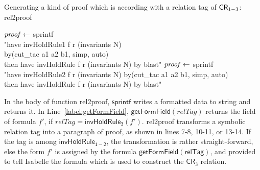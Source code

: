 \begin{algorithm}[!t]
\caption{Generating a kind of proof which is according with a relation tag of ${\sf CR}_{1-3}$: rel2proof}
\label{alg:proofGenOfReltag}
{
  {${\it proof} \leftarrow $ sprintf\\
\twoSpaces"have invHoldRule1 f r (invariants N)  \\
\twoSpaces         by(cut\_tac a1 a2 b1, simp, auto) \\
\twoSpaces then have invHoldRule f r (invariants N)  by blast" \; }
  {${\it proof} \leftarrow$  sprintf\\
\twoSpaces"have invHoldRule2 f r (invariants N)
\twoSpaces         by(cut\_tac a1 a2 b1, simp, auto) \\
\twoSpaces then have invHoldRule f r (invariants N)  by blast" \; }
}
\end{algorithm}

In the body of function {\sf rel2proof},  $\mathsf{sprintf}$ writes a formatted data to string and returns it.
In Line~\ref{label:getFormField}, $\mathsf{getFormField}(relTag)$ returns the field of formula $f'$,
if $relTag=\mathsf{invHoldRule_3}(f')$.
{\sf rel2proof} transforms a symbolic relation tag into a paragraph of proof, as shown in lines 7-8, 10-11, or 13-14.
If the tag is among $\mathsf{invHoldRule_{1-2}}$,
the transformation is rather straight-forward, else the form $f'$ is assigned
by the formula $\mathsf{getFormField(relTag)}$, and provided to tell Isabelle the formula
which is used to construct the $\mathsf{CR}_3$ relation.


